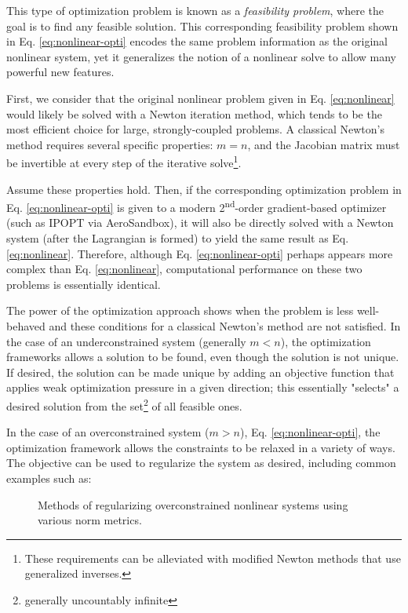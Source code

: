 This type of optimization problem is known as a \textit{feasibility problem}, where the goal is to find any feasible solution. This corresponding feasibility problem shown in Eq. \ref{eq:nonlinear-opti} encodes the same problem information as the original nonlinear system, yet it generalizes the notion of a nonlinear solve to allow many powerful new features.

First, we consider that the original nonlinear problem given in Eq. \ref{eq:nonlinear} would likely be solved with a Newton iteration method, which tends to be the most efficient choice for large, strongly-coupled problems. A classical Newton's method requires several specific properties: $m = n$, and the Jacobian matrix must be invertible at every step of the iterative solve\footnote{These requirements can be alleviated with modified Newton methods that use generalized inverses.}.

Assume these properties hold. Then, if the corresponding optimization problem in Eq. \ref{eq:nonlinear-opti} is given to a modern 2\textsuperscript{nd}-order gradient-based optimizer (such as IPOPT via AeroSandbox), it will also be directly solved with a Newton system (after the Lagrangian is formed) to yield the same result as Eq. \ref{eq:nonlinear}. Therefore, although Eq. \ref{eq:nonlinear-opti} perhaps appears more complex than Eq. \ref{eq:nonlinear}, computational performance on these two problems is essentially identical.

The power of the optimization approach shows when the problem is less well-behaved and these conditions for a classical Newton's method are not satisfied. In the case of an underconstrained system (generally $m < n$), the optimization frameworks allows a solution to be found, even though the solution is not unique. If desired, the solution can be made unique by adding an objective function that applies weak optimization pressure in a given direction; this essentially "selects" a desired solution from the set\footnote{generally uncountably infinite} of all feasible ones.

In the case of an overconstrained system ($m > n$), Eq. \ref{eq:nonlinear-opti}, the optimization framework allows the constraints to be relaxed in a variety of ways. The objective can be used to regularize the system as desired, including common examples such as:

\begin{figure}[H]
    \centerline{}
    \caption{Methods of regularizing overconstrained nonlinear systems using various norm metrics.}
    \label{fig:opti-norms}
\end{figure}

